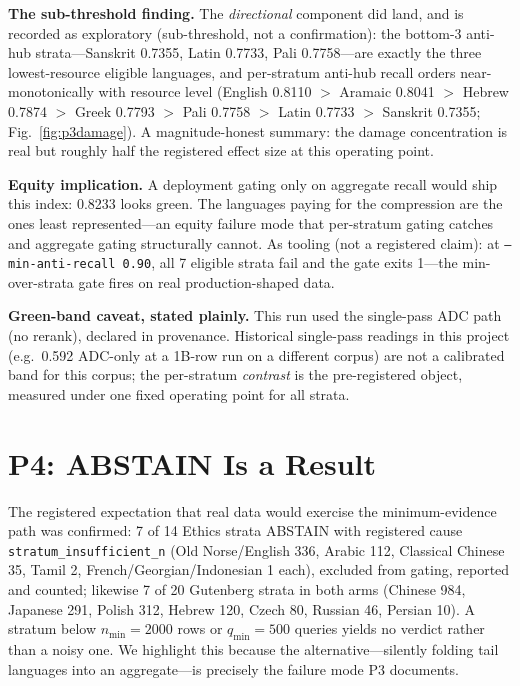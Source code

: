\documentclass[11pt]{article}
\begin{document}
\textbf{The sub-threshold finding.} The \emph{directional} component did
land, and is recorded as exploratory (sub-threshold, not a confirmation):
the bottom-3 anti-hub strata---Sanskrit 0.7355, Latin 0.7733, Pali
0.7758---are exactly the three lowest-resource eligible languages, and
per-stratum anti-hub recall orders near-monotonically with resource level
(English 0.8110 $>$ Aramaic 0.8041 $>$ Hebrew 0.7874 $>$ Greek 0.7793 $>$
Pali 0.7758 $>$ Latin 0.7733 $>$ Sanskrit 0.7355;
Fig.~\ref{fig:p3damage}). A magnitude-honest summary: the damage
concentration is real but roughly half the registered effect size at this
operating point.

\textbf{Equity implication.} A deployment gating only on aggregate recall
would ship this index: 0.8233 looks green. The languages paying for the
compression are the ones least represented---an equity failure mode that
per-stratum gating catches and aggregate gating structurally cannot. As
tooling (not a registered claim): at \texttt{--min-anti-recall 0.90}, all
7 eligible strata fail and the gate exits 1---the min-over-strata gate
fires on real production-shaped data.

\textbf{Green-band caveat, stated plainly.} This run used the single-pass
ADC path (no rerank), declared in provenance. Historical single-pass
readings in this project (e.g.\ 0.592 ADC-only at a 1B-row run on a
different corpus) are not a calibrated band for this corpus; the
per-stratum \emph{contrast} is the pre-registered object, measured under
one fixed operating point for all strata.

\section{P4: ABSTAIN Is a Result}
\label{sec:p4}

The registered expectation that real data would exercise the
minimum-evidence path was confirmed: 7 of 14 Ethics strata ABSTAIN with
registered cause \texttt{stratum\_insufficient\_n} (Old Norse/English 336,
Arabic 112, Classical Chinese 35, Tamil 2, French/Georgian/Indonesian 1
each), excluded from gating, reported and counted; likewise 7 of 20
Gutenberg strata in both arms (Chinese 984, Japanese 291, Polish 312,
Hebrew 120, Czech 80, Russian 46, Persian 10). A stratum below
$n_{\min} = 2000$ rows or $q_{\min} = 500$ queries yields no verdict rather
than a noisy one. We highlight this because the alternative---silently
folding tail languages into an aggregate---is precisely the failure mode
P3 documents.
\end{document}
